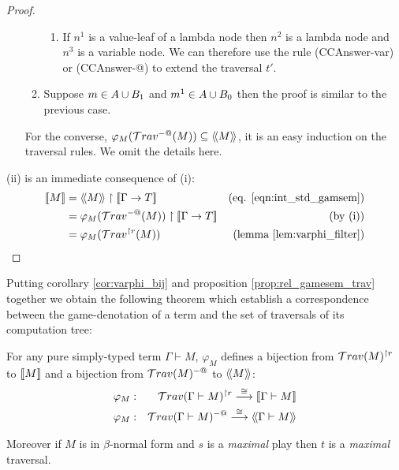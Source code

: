 \begin{proof}
\begin{itemize}
\begin{enumerate}
\begin{enumerate}
        \item If $n^1$ is a value-leaf of a lambda node then $n^2$ is a lambda node and $n^3$ is a variable node.
        We can therefore use the rule (CCAnswer-var) or (CCAnswer-@) to extend the traversal $t'$.
        \end{enumerate}

    \item Suppose $m \in A \cup B_1$ and $m^1 \in A \cup B_0$ then
    the proof is similar to the previous case.
    \end{enumerate}


  For the converse, $\varphi_{M}( \mathcal{T}rav^{-@}(M) ) \subseteq {\langle\!\langle M \rangle\!\rangle}$, it is an easy induction
  on the traversal rules. We omit the details here.
\end{itemize}

(ii) is an immediate consequence of (i):
\begin{align*}
\sem{M} &= \intersem{M} \upharpoonright \sem{\Gamma \rightarrow T} & \mbox{(eq. \ref{eqn:int_std_gamsem})} \\
        &= \varphi_M(\travset^{-@}(M)) \upharpoonright \sem{\Gamma \rightarrow T} & \mbox{(by (i))}\\
        &= \varphi_M(\travset^{\upharpoonright r}(M)) & \mbox{(lemma \ref{lem:varphi_filter})}
\end{align*}
\end{proof}


Putting corollary \ref{cor:varphi_bij} and proposition
\ref{prop:rel_gamesem_trav} together we obtain the following theorem
which establish a correspondence between the game-denotation of a
term and the set of traversals of its computation tree:

\begin{thm}
\label{thm:correspondence}
 For any pure simply-typed term $\Gamma \vdash M$,
$\varphi_M$ defines a bijection from $\mathcal{T}rav(M)^{\upharpoonright
r}$ to ${[\![ M ]\!]}$ and a bijection from $\mathcal{T}rav(M)^{-@}$ to
${\langle\!\langle M \rangle\!\rangle}$:
\begin{eqnarray*}
 \varphi_M  &:& \mathcal{T}rav(\Gamma \vdash M)^{\upharpoonright r} \stackrel{\cong}{\longrightarrow} {[\![ \Gamma \vdash M ]\!]} \\
 \varphi_M  &:& \mathcal{T}rav(\Gamma \vdash M)^{-@} \stackrel{\cong}{\longrightarrow} {\langle\!\langle \Gamma \vdash M \rangle\!\rangle}
\end{eqnarray*}

Moreover if $M$ is in $\beta$-normal form and $s$ is a
\emph{maximal} play then  $t$ is a \emph{maximal} traversal.
\end{thm}

